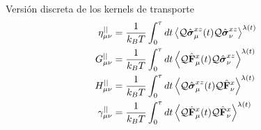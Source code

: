 \documentclass{beamer}
\begin{document}
\begin{frame}{Versión discreta de los kernels de transporte}
\begin{align}
\eta^{||}_{\mu\nu}&
=\frac{1}{k_BT}\int_0^\tau  dt\left\langle 
{\cal Q}\hat{\boldsymbol{\sigma}}^{xz}_\mu(t){\cal Q}\hat{\boldsymbol{\sigma}}^{xz}_\nu
  \right\rangle^{\lambda(t)}&&
\nonumber\\
G^{||}_{\mu\nu}&
=\frac{1}{k_BT} \int_0^\tau  dt
\left\langle{\cal Q}\hat{\bf F}^{x}_\mu(t)
{\cal Q}\hat{\boldsymbol{\sigma}}^{xz}_\nu
\right\rangle^{\lambda(t)}&&
\nonumber\\
H^{||}_{\mu\nu}&
=\frac{1}{k_BT} 
\int_0^\tau  dt
\left\langle{\cal Q}\hat{\boldsymbol{\sigma}}^{xz}_\mu(t){\cal Q}\hat{\bf F}^{x}_\nu\right\rangle^{\lambda(t)}&&
\nonumber\\
\gamma^{||}_{\mu\nu}&=
\frac{1}{k_BT} \int_0^\tau  dt
\left\langle 
{\cal Q}\hat{\bf F}^{x}_\mu(t)
{\cal Q}\hat{\bf F}^{x}_\nu\right\rangle^{\lambda(t)}&&
\nonumber
\end{align}
\end{frame}

\end{document}
